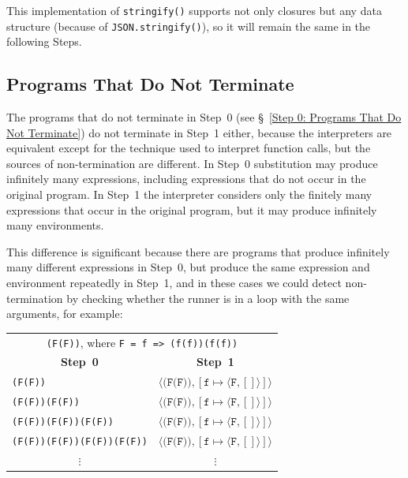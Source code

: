 \documentclass[12pt, oneside]{book}
\begin{document}
This implementation of \texttt{stringify()} supports not only closures but any data structure (because of \texttt{JSON.stringify()}), so it will remain the same in the following Steps.

\subsection{Programs That Do Not Terminate}
\label{Step 1: Programs That Do Not Terminate}

The programs that do not terminate in Step~0 (see §~\ref{Step 0: Programs That Do Not Terminate}) do not terminate in Step~1 either, because the interpreters are equivalent except for the technique used to interpret function calls, but the sources of non-termination are different. In Step~0 substitution may produce infinitely many expressions, including expressions that do not occur in the original program. In Step~1 the interpreter considers only the finitely many expressions that occur in the original program, but it may produce infinitely many environments.

This difference is significant because there are programs that produce infinitely many different expressions in Step~0, but produce the same expression and environment repeatedly in Step~1, and in these cases we could detect non-termination by checking whether the runner is in a loop with the same arguments, for example:

\begin{center}
\begin{tabular}{ll}
\multicolumn{2}{c}{\texttt{(F(F))}, where \texttt{F = f => (f(f))(f(f))}} \\
\multicolumn{1}{c}{\textbf{Step~0}} & \multicolumn{1}{c}{\textbf{Step~1}} \\
\texttt{(F(F))} & $\langle \texttt{(F(F))}, [\texttt{f} \mapsto \langle \texttt{F}, [] \rangle] \rangle$ \\
\texttt{(F(F))(F(F))} & $\langle \texttt{(F(F))}, [\texttt{f} \mapsto \langle \texttt{F}, [] \rangle] \rangle$ \\
\texttt{(F(F))(F(F))(F(F))} & $\langle \texttt{(F(F))}, [\texttt{f} \mapsto \langle \texttt{F}, [] \rangle] \rangle$ \\
\texttt{(F(F))(F(F))(F(F))(F(F))} & $\langle \texttt{(F(F))}, [\texttt{f} \mapsto \langle \texttt{F}, [] \rangle] \rangle$ \\
\multicolumn{1}{c}{$\vdots$} & \multicolumn{1}{c}{$\vdots$} \\
\end{tabular}
\end{center}
\end{document}
